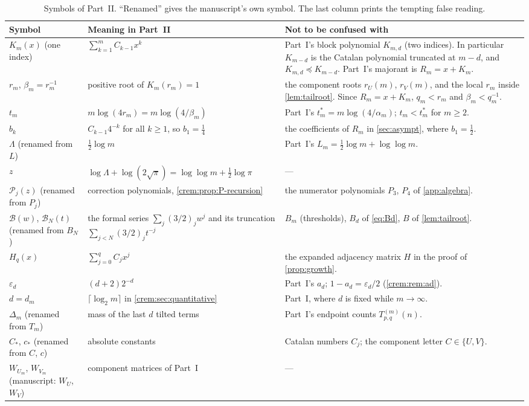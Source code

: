 \documentclass[11pt,a4paper]{article}
\theoremstyle{definition}\newaliascnt{definition}{theorem}
\theoremstyle{remark}\newaliascnt{remark}{theorem}
\newcommand{\preceqc}{\preceq}
\newcommand{\eps}{\varepsilon}
\newcommand{\Bformal}{\mathcal B}%
\begin{document}
\begin{table}[htbp]
\centering\small
\caption{Symbols of Part~II. ``Renamed'' gives the manuscript's own symbol.
The last column prints the tempting false reading.}
\label{crem:tab:notation}
\begin{tabular}{>{\raggedright}p{.19\linewidth}>{\raggedright}p{.36\linewidth}>{\raggedright\arraybackslash}p{.37\linewidth}}
\toprule
Symbol & Meaning in Part~II & Not to be confused with\\
\midrule
$K_m(x)$ (one index) & $\sum_{k=1}^mC_{k-1}x^k$ & Part~I's block polynomial
 $K_{m,d}$ (two indices). In particular $K_{m-d}$ is the Catalan polynomial
 truncated at $m-d$, and $K_{m,d}\preceqc K_{m-d}$. Part~I's majorant is
 $R_m=x+K_m$.\\
$r_m$, $\beta_m=r_m^{-1}$ & positive root of $K_m(r_m)=1$ & the component
 roots $r_U(m)$, $r_V(m)$, and the local $r_m$ inside
 \cref{lem:tailroot}. Since $R_m=x+K_m$, $q_m<r_m$ and
 $\beta_m<q_m^{-1}$.\\
$t_m$ & $m\log(4r_m)=m\log(4/\beta_m)$ & Part~I's $t_m^*=m\log(4/\alpha_m)$;
 $t_m<t_m^*$ for $m\ge2$.\\
$b_k$ & $C_{k-1}4^{-k}$ for all $k\ge1$, so $b_1=\frac14$ & the
 coefficients of $R_m$ in \cref{sec:asympt}, where $b_1=\frac12$.\\
$\Lambda$ (renamed from $L$) & $\frac12\log m$ & Part~I's
 $L_m=\frac12\log m+\log\log m$.\\
$z$ & $\log\Lambda+\log(2\sqrt\pi)=\log\log m+\frac12\log\pi$ & ---\\
$\mathcal P_j(z)$ (renamed from $P_j$) & correction polynomials,
 \cref{crem:prop:P-recursion} & the numerator polynomials $P_3$, $P_4$ of
 \cref{app:algebra}.\\
$\Bformal(w)$, $\Bformal_N(t)$ (renamed from $B_N$) & the formal series
 $\sum_j(3/2)_jw^j$ and its truncation $\sum_{j<N}(3/2)_jt^{-j}$ & $B_m$
 (thresholds), $B_d$ of \eqref{eq:Bd}, $B$ of \cref{lem:tailroot}.\\
$H_q(x)$ & $\sum_{j=0}^qC_jx^j$ & the expanded adjacency matrix $H$ in the
 proof of \cref{prop:growth}.\\
$\eps_d$ & $(d+2)2^{-d}$ & Part~I's $a_d$; $1-a_d=\eps_d/2$
 (\cref{crem:rem:ad}).\\
$d=d_m$ & $\lceil\log_2m\rceil$ in \cref{crem:sec:quantitative} & Part~I,
 where $d$ is fixed while $m\to\infty$.\\
$\Delta_m$ (renamed from $T_m$) & mass of the last $d$ tilted terms &
 Part~I's endpoint counts $T^{(m)}_{p,q}(n)$.\\
$C_\ast$, $c_\ast$ (renamed from $C$, $c$) & absolute constants & Catalan
 numbers $C_j$; the component letter $C\in\{U,V\}$.\\
$W_{U_m}$, $W_{V_m}$ (manuscript: $W_U$, $W_V$) & component matrices of
 Part~I & ---\\
\bottomrule
\end{tabular}
\end{table}
\end{document}
